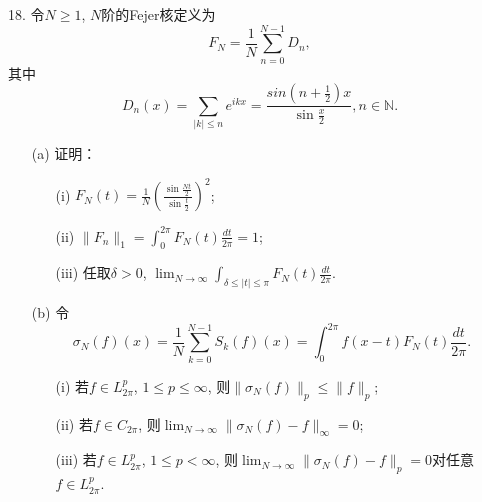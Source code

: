 \documentclass[a4paper,8pt]{ctexart}\textwidth 140mm \textheight 216mm
\newcommand{\8}{\infty}
\begin{document}


18. 令$N\geq 1$, $N$阶的Fejer核定义为
\[F_N=\frac{1}{N}\sum_{n=0}^{N-1}D_n,\]
其中
\[D_n(x)=\sum_{|k|\leq n}e^{ikx}=\frac{sin(n+\frac{1}{2})x}{\sin \frac{x}{2}},n\in\mathbb{N}.\]
\begin{itemize}
	\item[(a)] 证明：
	\begin{itemize}
		\item[(i)] $F_N(t)=\frac{1}{N}\left(\frac{\sin \frac{Nt}{2}}{\sin \frac{t}{2}}\right)^2$;
		\item[(ii)] $\|F_n\|_1=\int _0^{2\pi} F_N(t)\frac{dt}{2\pi}=1$;
		\item[(iii)] 任取$\delta>0$, $\lim_{N\to\infty}\int_{\delta\leq |t|\leq \pi}F_N(t)\frac{dt}{2\pi}$.
	\end{itemize}
	\item[(b)]令
	\[\sigma_N(f)(x)=\frac{1}{N}\sum_{k=0}^{N-1}S_k(f)(x)=\int_0^{2\pi}f(x-t)F_N(t)\frac{dt}{2\pi}.\]
	\begin{itemize}
		\item[(i)] 若$f\in L_{2\pi}^p$, $1\leq p\leq \infty$, 则$\|\sigma_N(f)\|_p\leq \|f\|_p$;
		\item[(ii)] 若$f\in C_{2\pi}$, 则$\lim_{N\to\infty}\|\sigma_N(f)-f\|_\infty=0$;
		\item[(iii)] 若$f\in L_{2\pi}^p$, $1\leq p<\infty$, 则$\lim_{N\to\infty}\|\sigma_{N}(f)-f\|_p=0$对任意$f\in L_{2\pi}^p$.
	\end{itemize}
\end{itemize}
\end{document}
